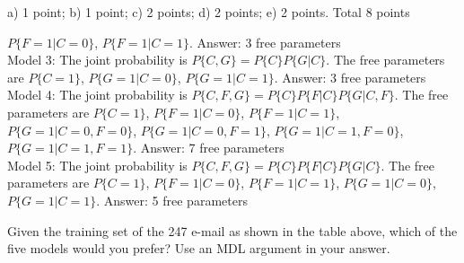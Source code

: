 \documentclass[a4paper]{article}
\begin{document}
\begin{exam}
\begin{vraag}{a) 1 point; b) 1 point; c) 2 points; d) 2 points; e) 2 points. Total 8 points}
\begin{deelvraag}
{$P\{F=1|C=0\}$, $P\{F=1|C=1\}$.
\newline
Answer: 3 free parameters
\\[\baselineskip]
Model 3: The joint probability is $P\{C,G\} = P\{C\}P\{G|C\}$.
The free parameters are $P\{C=1\}$, 
$P\{G=1|C=0\}$, $P\{G=1|C=1\}$.
\newline
Answer: 3 free parameters
\\[\baselineskip]
Model 4: The joint probability is $P\{C,F,G\} = P\{C\}P\{F|C\}P\{G|C,F\}$.
The free parameters are $P\{C=1\}$, 
$P\{F=1|C=0\}$, $P\{F=1|C=1\}$,
$P\{G=1|C=0,F=0\}$, $P\{G=1|C=0,F=1\}$,
$P\{G=1|C=1,F=0\}$, $P\{G=1|C=1,F=1\}$.
\newline
Answer: 7 free parameters
\\[\baselineskip]
Model 5: The joint probability is $P\{C,F,G\} = P\{C\}P\{F|C\}P\{G|C\}$.
The free parameters are $P\{C=1\}$, 
$P\{F=1|C=0\}$, $P\{F=1|C=1\}$,
$P\{G=1|C=0\}$, $P\{G=1|C=1\}$.
\newline
Answer: 5 free parameters
  }
\end{deelvraag}
\begin{deelvraag}
  Given the training set of the 247 e-mail as shown in the table above,
  which of the five models would you prefer? Use an MDL argument in your answer.


\end{deelvraag}
\end{vraag}
\end{exam}
\end{document}
